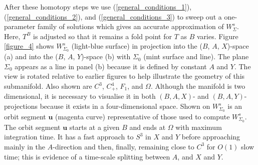\documentclass{ws-ijbc}
\begin{document}
After these homotopy steps we use (\ref{general_conditions_1}), (\ref{general_conditions_2}), and (\ref{general_conditions_3}) to sweep out a one-parameter family of solutions which gives an accurate approximation of $W^s_\Sigma$.  Here, $T^B$ is adjusted so that it remains a fold point for $T$ as $B$ varies. Figure \ref{figure_4} shows $W^s_{\Sigma_0}$ (light-blue surface) in projection into the ($B$, $A$, $X$)-space (a) and into the ($B$, $A$, $Y$)-space (b) with $\Sigma_0$ (mint surface and line).  The plane $\Sigma_0$ appears as a line in panel (b) because it is defined by constant $A$ and $Y$.  The view is rotated relative to earlier figures to help illustrate the geometry of this submanifold.  Also shown are $C^3$, $C^4_+$, $F_1$, and $\Omega$.  Although the manifold is two dimensional, it is necessary to visualise it in both $(B,A,X)$- and $(B,A,Y)$-projections because it exists in a four-dimensional space.  Shown on $W^s_{\Sigma_0}$ is an orbit segment $\mathbf{u}$ (magenta curve) representative of those used to compute $W^s_{\Sigma_0}$.  The orbit segment $\mathbf{u}$ starts at a given $B$ and ends at $\Omega$ with maximum integration time.  It has a fast approach to $S^3$ in $X$ and $Y$ before approaching mainly in the $A$-direction and then, finally, remaining close to $C^3$ for $O(1)$ slow time; this is evidence of a time-scale splitting  between $A$, and $X$ and $Y$.
\end{document}
